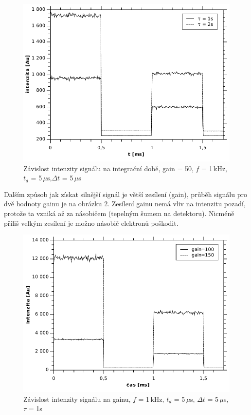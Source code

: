 \documentclass[12pt]{article}
\begin{document}
\begin{figure}[htbp]
\begin{center}
\includegraphics[width=12cm]{intdoba.pdf}
\caption{Závislost intenzity signálu na integrační době, gain = 50, $f$ = 1\,kHz, $t_d$ = 5\,$\mu$s,\newline $\Delta t$ = 5\,$\mu$s}
\label{intdoba}
\end{center}
\end{figure}

Dalším způsob jak získat silnější signál je větší zesílení (gain), průběh signálu pro dvě hodnoty gainu je na obrázku \ref{gain2}. Zesílení gainu nemá vliv na intenzitu pozadí, protože ta vzniká až za násobičem (tepelným šumem na detektoru). Nicméně příliš velkým zesílení je možno násobič elektronů poškodit. 

\begin{figure}[htbp]
\begin{center}
\includegraphics[width=12cm]{gain2.pdf}
\caption{Závislost intenzity signálu na gainu, $f$ = 1\,kHz, $t_d$ = 5\,$\mu$s, $\Delta t$ = 5\,$\mu$s, $\tau$ = 1s}
\label{gain2}
\end{center}
\end{figure}
\end{document}
